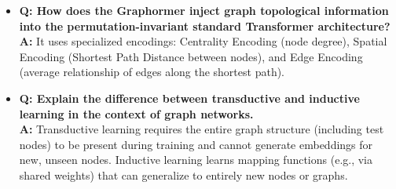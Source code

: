 \begin{itemize}
    \textbf{A:} Over-smoothing occurs when many layers cause node representations to converge and become indistinguishable. Over-squashing happens when a node's entire exponentially growing $K$-hop neighborhood must be compressed into a single fixed-size vector, causing information loss.
    \item \textbf{Q: How does the Graphormer inject graph topological information into the permutation-invariant standard Transformer architecture?} \\
    \textbf{A:} It uses specialized encodings: Centrality Encoding (node degree), Spatial Encoding (Shortest Path Distance between nodes), and Edge Encoding (average relationship of edges along the shortest path).
    \item \textbf{Q: Explain the difference between transductive and inductive learning in the context of graph networks.} \\
    \textbf{A:} Transductive learning requires the entire graph structure (including test nodes) to be present during training and cannot generate embeddings for new, unseen nodes. Inductive learning learns mapping functions (e.g., via shared weights) that can generalize to entirely new nodes or graphs.
\end{itemize}
